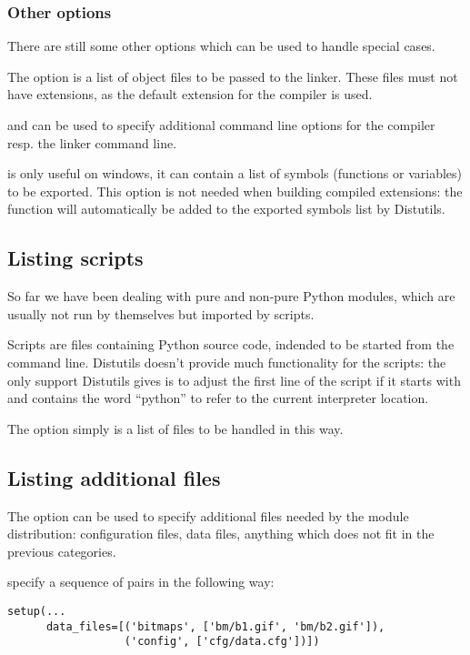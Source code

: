 \documentclass{howto}
\begin{document}

\subsubsection{Other options}

There are still some other options which can be used to handle special
cases.

The  option is a list of object files to be passed
to the linker. These files must not have extensions, as the default
extension for the compiler is used.

 and  can be used
to specify additional command line options for the compiler resp.
the linker command line.

 is only useful on windows, it can contain a list
of symbols (functions or variables) to be exported. This option
is not needed when building compiled extensions: the 
function will automatically be added to the exported symbols list
by Distutils.

\subsection{Listing scripts}
So far we have been dealing with pure and non-pure Python modules,
which are usually not run by themselves but imported by scripts.

Scripts are files containing Python source code, indended to be started
from the command line.
Distutils doesn't provide much functionality for the scripts: the only
support Distutils gives is to adjust the first line of the script
if it starts with \code{\#!} and contains the word ``python'' to refer
to the current interpreter location.

The  option simply is a list of files to be handled
in this way.


\subsection{Listing additional files}
The  option can be used to specify additional
files needed by the module distribution: configuration files,
data files, anything which does not fit in the previous categories.

 specify a sequence of 
pairs in the following way:
\begin{verbatim}
setup(...
      data_files=[('bitmaps', ['bm/b1.gif', 'bm/b2.gif']),
                  ('config', ['cfg/data.cfg'])])
\end{verbatim}
\end{document}
